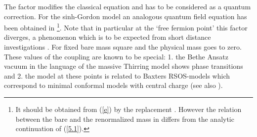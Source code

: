 \documentclass[a4paper,a4paper]{article}
\def\endproof{\mbox{\ \rule{.1in}{.1in}}}
\begin{document}

The factor \myHighlight{$\frac{\pi \nu }{\sin \pi \nu }$}\coordHE{} modifies the classical equation
and has to be considered as a quantum correction. For the sinh-Gordon model
an analogous quantum field equation has been obtained in \cite{MS}\footnote{%
It should be obtained from (\ref{e}) by the replacement \coordHE{}. However the relation between the bare and the renormalized mass in 
\cite{MS} differs from the analytic continuation of (\ref{5.1}).}. Note that
in particular at the `free fermion point' \coordHE{} this factor diverges, a phenomenon which is to be
expected from short distance investigations \cite{ST}. For fixed bare mass
square \myHighlight{$\alpha $}\coordHE{} and \coordHE{} the physical mass goes
to zero. These values of the coupling are known to be special: 1. the Bethe
Ansatz vacuum in the language of the massive Thirring model shows phase
transitions \cite{Ko} and 2. the model at these points is related \cite
{K3,LeC,Sm2} to Baxters RSOS-models which correspond to minimal conformal
models with central charge \coordHE{} (see also \cite{MS}).
\end{document}
